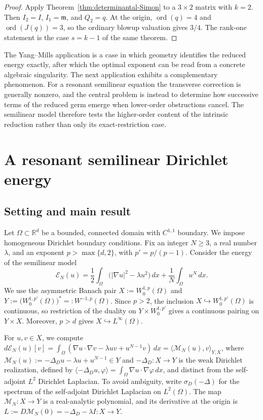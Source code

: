 \documentclass[11pt]{article}
\theoremstyle{definition}
\theoremstyle{remark}
\begin{document}
\begin{proof}
Apply Theorem~\ref{thm:determinantal-Simon} to a $3\times2$ matrix with $k=2$. Then $I_2=I$, $I_1=\mathfrak m$, and $Q_2=q$. At the origin, $\operatorname{ord}(q)=4$ and $\operatorname{ord}(J(q))=3$, so the ordinary blowup valuation gives $3/4$. The rank-one statement is the case $s=k-1$ of the same theorem.
\end{proof}

The Yang--Mills application is a case in which geometry identifies the reduced energy exactly, after which the optimal exponent can be read from a concrete algebraic singularity. The next application exhibits a complementary phenomenon. For a resonant semilinear equation the transverse correction is generally nonzero, and the central problem is instead to determine how successive terms of the reduced germ emerge when lower-order obstructions cancel. The semilinear model therefore tests the higher-order content of the intrinsic reduction rather than only its exact-restriction case.

\section{A resonant semilinear Dirichlet energy}\label{sec:semilinear}

\subsection{Setting and main result}

Let $\Omega\subset\mathbb{R}^d$ be a bounded, connected domain with $C^{1,1}$ boundary. We impose homogeneous Dirichlet boundary conditions. Fix an integer $N\ge3$, a real number $\lambda$, and an exponent $p>\max\{d,2\}$, with $p'=p/(p-1)$. Consider the energy of the semilinear model
$$\mathcal{E}_N(u)=\frac12\int_\Omega\bigl(|\nabla u|^2-\lambda u^2\bigr)\,dx
       +\frac1N\int_\Omega u^N\,dx.$$
We use the asymmetric Banach pair $X:=W^{1,p}_0(\Omega)$ and $Y:=\bigl(W^{1,p'}_0(\Omega)\bigr)^*=:W^{-1,p}(\Omega)$.
Since $p>2$, the inclusion $X\hookrightarrow W^{1,p'}_0(\Omega)$ is continuous, so restriction of the duality on $Y\times W^{1,p'}_0$ gives a continuous pairing on 
$Y\times X$. Moreover, $p>d$ gives $X\hookrightarrow L^\infty(\Omega)$.

\smallskip
For $u,v\in X$, we compute $d\mathcal{E}_N(u)[v]=\int_\Omega(\nabla u\cdot\nabla v-\lambda uv+u^{N-1}v)\,dx=\langle\mathcal M_N(u),v\rangle_{Y,X}$, where $\mathcal{M}_N(u):=-\Delta_D u-\lambda u+u^{N-1}\in Y$
and $-\Delta_D:X\to Y$ is the weak Dirichlet realization, defined by $\langle-\Delta_Du,\varphi\rangle=\int_\Omega\nabla u\cdot\nabla\varphi\,dx$, and distinct from the self-adjoint $L^2$ Dirichlet Laplacian. To avoid ambiguity, write $\sigma_D(-\Delta)$ for the spectrum of the self-adjoint Dirichlet Laplacian on $L^2(\Omega)$. 
The map $\mathcal M_N:X\to Y$ is a real-analytic polynomial, and its derivative at the origin is $L:=D\mathcal M_N(0)=-\Delta_D-\lambda I:X\to Y$.
\end{document}
